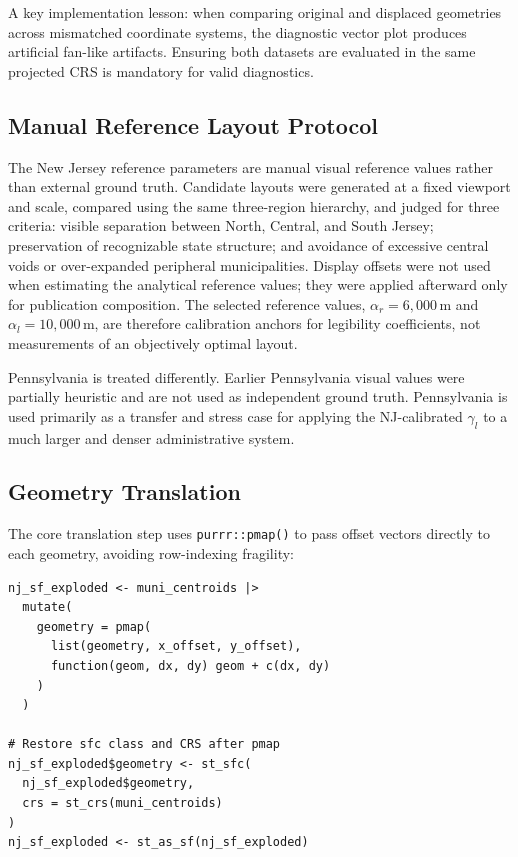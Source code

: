 \documentclass[12pt, a4paper]{article}
\numberwithin{equation}{section}
\begin{document}
A key implementation lesson: when comparing original and displaced geometries across mismatched coordinate systems, the diagnostic vector plot produces artificial fan-like artifacts. Ensuring both datasets are evaluated in the same projected CRS is mandatory for valid diagnostics.

\subsection{Manual Reference Layout Protocol}

The New Jersey reference parameters are manual visual reference values rather than external ground truth. Candidate layouts were generated at a fixed viewport and scale, compared using the same three-region hierarchy, and judged for three criteria: visible separation between North, Central, and South Jersey; preservation of recognizable state structure; and avoidance of excessive central voids or over-expanded peripheral municipalities. Display offsets were not used when estimating the analytical reference values; they were applied afterward only for publication composition. The selected reference values, $\alpha_r = 6{,}000$\,m and $\alpha_l = 10{,}000$\,m, are therefore calibration anchors for legibility coefficients, not measurements of an objectively optimal layout.

Pennsylvania is treated differently. Earlier Pennsylvania visual values were partially heuristic and are not used as independent ground truth. Pennsylvania is used primarily as a transfer and stress case for applying the NJ-calibrated $\gamma_l$ to a much larger and denser administrative system.

\subsection{Geometry Translation}

The core translation step uses \texttt{purrr::pmap()} to pass offset vectors directly to each geometry, avoiding row-indexing fragility:

\begin{lstlisting}[caption={Core geometry translation using \texttt{pmap()}.}]
nj_sf_exploded <- muni_centroids |>
  mutate(
    geometry = pmap(
      list(geometry, x_offset, y_offset),
      function(geom, dx, dy) geom + c(dx, dy)
    )
  )

# Restore sfc class and CRS after pmap
nj_sf_exploded$geometry <- st_sfc(
  nj_sf_exploded$geometry,
  crs = st_crs(muni_centroids)
)
nj_sf_exploded <- st_as_sf(nj_sf_exploded)
\end{lstlisting}
\end{document}

